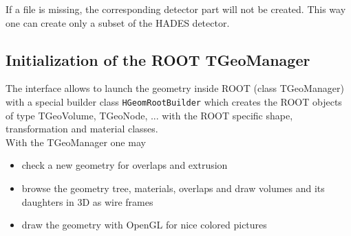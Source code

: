 If a file is missing, the corresponding detector part will not be created. This way one can create only a subset of the HADES 
detector.


\subsection[Initialization of the ROOT TGeoManager]{Initialization of the ROOT TGeoManager}

The interface allows to launch the geometry inside ROOT (class TGeoManager) with a special builder class \verb+HGeomRootBuilder+ 
which creates the ROOT objects of type TGeoVolume, TGeoNode, ... with the ROOT specific shape, transformation and material 
classes.\\

With the TGeoManager one may 
\begin{itemize}
  \setlength{\itemsep}{0pt}    
  \item check a new geometry for overlaps and extrusion
  \item browse the geometry tree, materials, overlaps and draw volumes and its daughters in 3D as wire frames
  \item draw the geometry with OpenGL for nice colored pictures 
\end{itemize}

